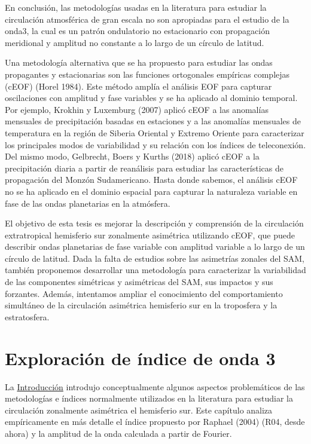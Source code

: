\documentclass[12pt,oneside,a4paper]{reedthesis}
\begin{document}
En conclusión, las metodologías usadas en la literatura para estudiar la circulación atmosférica de gran escala no son apropiadas para el estudio de la onda3, la cual es un patrón ondulatorio no estacionario con propagación meridional y amplitud no constante a lo largo de un círculo de latitud.

Una metodología alternativa que se ha propuesto para estudiar las ondas propagantes y estacionarias son las funciones ortogonales empíricas complejas (cEOF) (Horel 1984).
Este método amplía el análisis EOF para capturar oscilaciones con amplitud y fase variables y se ha aplicado al dominio temporal.
Por ejemplo, Krokhin y Luxemburg (2007) aplicó cEOF a las anomalías mensuales de precipitación basadas en estaciones y a las anomalías mensuales de temperatura en la región de Siberia Oriental y Extremo Oriente para caracterizar los principales modos de variabilidad y su relación con los índices de teleconexión.
Del mismo modo, Gelbrecht, Boers y Kurths (2018) aplicó cEOF a la precipitación diaria a partir de reanálisis para estudiar las características de propagación del Monzón Sudamericano.
Hasta donde sabemos, el análisis cEOF no se ha aplicado en el dominio espacial para capturar la naturaleza variable en fase de las ondas planetarias en la atmósfera.

El objetivo de esta tesis es mejorar la descripción y comprensión de la circulación extratropical hemisferio sur zonalmente asimétrica utilizando cEOF, que puede describir ondas planetarias de fase variable con amplitud variable a lo largo de un círculo de latitud.
Dada la falta de estudios sobre las asimetrías zonales del SAM, también proponemos desarrollar una metodología para caracterizar la variabilidad de las componentes simétricas y asimétricas del SAM, sus impactos y sus forzantes.
Además, intentamos ampliar el conocimiento del comportamiento simultáneo de la circulación asimétrica hemisferio sur en la troposfera y la estratosfera.

\hypertarget{exploraciuxf3n-de-uxedndice-de-onda-3}{%
\chapter{Exploración de índice de onda 3}\label{exploraciuxf3n-de-uxedndice-de-onda-3}}

La \protect\hyperlink{intro}{Introducción} introdujo conceptualmente algunos aspectos problemáticos de las metodologías e índices normalmente utilizados en la literatura para estudiar la circulación zonalmente asimétrica el hemisferio sur.
Este capítulo analiza empíricamente en más detalle el índice propuesto por Raphael (2004) (R04, desde ahora) y la amplitud de la onda calculada a partir de Fourier.
\end{document}
